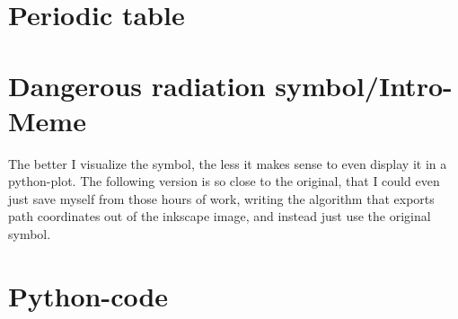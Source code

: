 \section{Periodic table}
\label{sec:periodic_table}


\section{Dangerous radiation symbol/Intro-Meme}
The better I visualize the symbol, the less it makes sense to even display it in a python-plot. The following version is so close to the original, that I could even just save myself from those hours of work, writing the algorithm that exports path coordinates out of the inkscape image, and instead just use the original symbol.

\section{Python-code}

